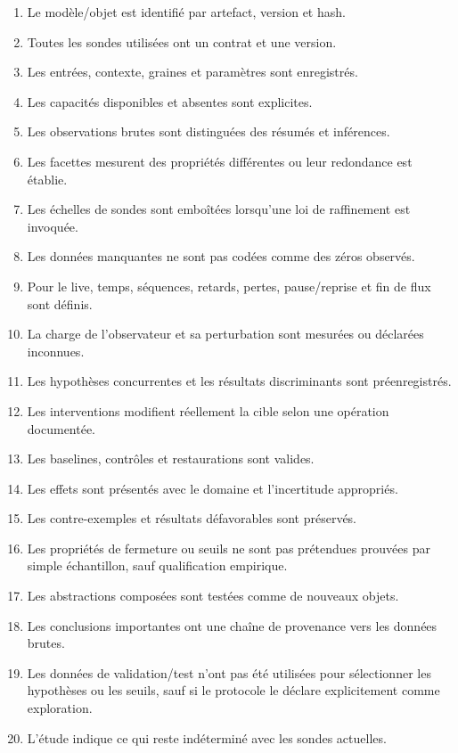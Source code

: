 \documentclass[11pt,oneside]{book}
\theoremstyle{definition}
\theoremstyle{remark}
\newcommand{\1}{\mathbf 1}
\begin{document}
\begin{enumerate}[label=\textbf{C\arabic*.}]
\item Le modèle/objet est identifié par artefact, version et hash.
\item Toutes les sondes utilisées ont un contrat et une version.
\item Les entrées, contexte, graines et paramètres sont enregistrés.
\item Les capacités disponibles et absentes sont explicites.
\item Les observations brutes sont distinguées des résumés et inférences.
\item Les facettes mesurent des propriétés différentes ou leur redondance est établie.
\item Les échelles de sondes sont emboîtées lorsqu'une loi de raffinement est invoquée.
\item Les données manquantes ne sont pas codées comme des zéros observés.
\item Pour le live, temps, séquences, retards, pertes, pause/reprise et fin de flux sont définis.
\item La charge de l'observateur et sa perturbation sont mesurées ou déclarées inconnues.
\item Les hypothèses concurrentes et les résultats discriminants sont préenregistrés.
\item Les interventions modifient réellement la cible selon une opération documentée.
\item Les baselines, contrôles et restaurations sont valides.
\item Les effets sont présentés avec le domaine et l'incertitude appropriés.
\item Les contre-exemples et résultats défavorables sont préservés.
\item Les propriétés de fermeture ou seuils ne sont pas prétendues prouvées par simple échantillon, sauf qualification empirique.
\item Les abstractions composées sont testées comme de nouveaux objets.
\item Les conclusions importantes ont une chaîne de provenance vers les données brutes.
\item Les données de validation/test n'ont pas été utilisées pour sélectionner les hypothèses ou les seuils, sauf si le protocole le déclare explicitement comme exploration.
\item L'étude indique ce qui reste indéterminé avec les sondes actuelles.
\end{enumerate}
\end{document}
